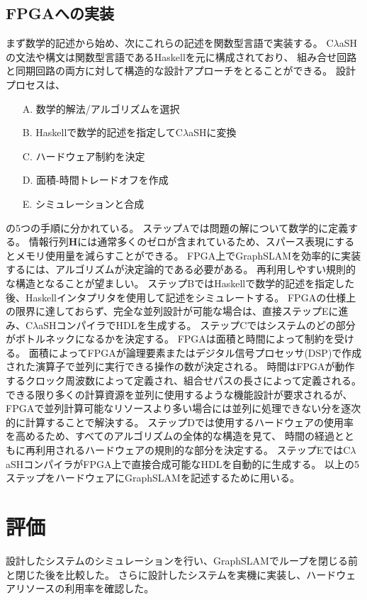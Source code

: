 \documentclass{jsarticle}
\begin{document}
\subsection{FPGAへの実装}
まず数学的記述から始め、次にこれらの記述を関数型言語で実装する。
C$\lambda$aSHの文法や構文は関数型言語であるHaskellを元に構成されており、
組み合せ回路と同期回路の両方に対して構造的な設計アプローチをとることができる。
設計プロセスは、
\begin{itemize}
    \item[A.] 数学的解法/アルゴリズムを選択
    \item[B.] Haskellで数学的記述を指定してC$\lambda$aSHに変換
    \item[C.] ハードウェア制約を決定
    \item[D.] 面積-時間トレードオフを作成
    \item[E.] シミュレーションと合成
\end{itemize}
の5つの手順に分かれている。
ステップAでは問題の解について数学的に定義する。
情報行列$\mathbf{H}$には通常多くのゼロが含まれているため、スパース表現にするとメモリ使用量を減らすことができる。
FPGA上でGraphSLAMを効率的に実装するには、アルゴリズムが決定論的である必要がある。
再利用しやすい規則的な構造となることが望ましい。
ステップBではHaskellで数学的記述を指定した後、Haskellインタプリタを使用して記述をシミュレートする。
FPGAの仕様上の限界に達しておらず、完全な並列設計が可能な場合は、直接ステップEに進み、C$\lambda$aSHコンパイラでHDLを生成する。
ステップCではシステムのどの部分がボトルネックになるかを決定する。
FPGAは面積と時間によって制約を受ける。
面積によってFPGAが論理要素またはデジタル信号プロセッサ(DSP)で作成された演算子で並列に実行できる操作の数が決定される。
時間はFPGAが動作するクロック周波数によって定義され、組合せパスの長さによって定義される。
できる限り多くの計算資源を並列に使用するような機能設計が要求されるが、
FPGAで並列計算可能なリソースより多い場合には並列に処理できない分を逐次的に計算することで解決する。
ステップDでは使用するハードウェアの使用率を高めるため、すべてのアルゴリズムの全体的な構造を見て、
時間の経過とともに再利用されるハードウェアの規則的な部分を決定する。
ステップEではC$\lambda$aSHコンパイラがFPGA上で直接合成可能なHDLを自動的に生成する。
以上の5ステップをハードウェアにGraphSLAMを記述するために用いる。

\section{評価}
設計したシステムのシミュレーションを行い、GraphSLAMでループを閉じる前と閉じた後を比較した。
さらに設計したシステムを実機に実装し、ハードウェアリソースの利用率を確認した。
\end{document}
